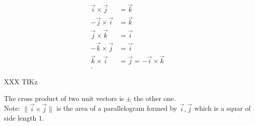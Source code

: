 \documentclass{report}
\begin{document}
     \raggedcolumns
     \begin{multicols}{2}
 

     \begin{align*}
       \vec{ i} \times \vec{j} &= \vec{ k} \\
       - \vec{ j} \times  \vec{ i} &= \vec{ k} \\
       \vec{ j} \times  \vec{ k} &= \vec{ i} \\
       - \vec{ k} \times  \vec{ j} &= \vec{ i} \\
        \vec{ k} \times  \vec{ i} &= \vec{ j} = - \vec{ i} \times  \vec{ k} \\
     .\end{align*}
         
     
     \break






 XXX TIKz


     \end{multicols}
   The cross product of two unit vectors is $ \pm$ the other one.\\
   Note: $ \|\vec{ i} \times  \vec{ j} \|  $  is the area of a parallelogram formed by $ \vec{ i} , \vec{ j} $ which is a squar of side length $ 1$.
\end{document}
